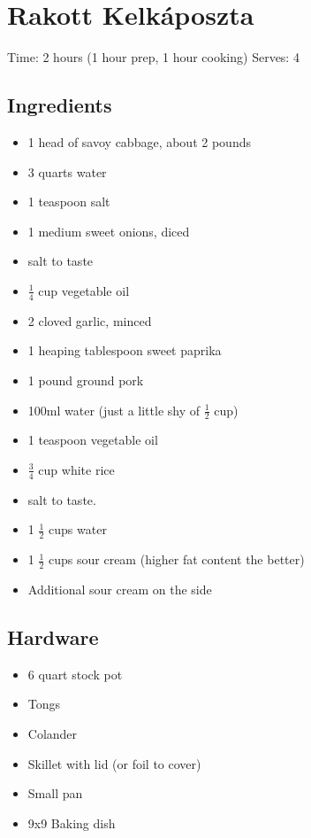 \section{Rakott Kelkáposzta}
\label{rakottKelkaposzta}
\setcounter{secnumdepth}{0}
Time: 2 hours (1 hour prep, 1 hour cooking)
Serves: 4

\begin{multicols}{2}
\subsection*{Ingredients}
\begin{itemize}
    \item 1 head of savoy cabbage, about 2 pounds
    \item 3 quarts water
    \item 1 teaspoon salt
    \item 1 medium sweet onions, diced
    \item salt to taste
    \item \( \frac{1}{4} \) cup vegetable oil
    \item 2 cloved garlic, minced
    \item 1 heaping tablespoon sweet paprika
    \item 1 pound ground pork
    \item 100ml water (just a little shy of \( \frac{1}{2} \) cup)
    \item 1 teaspoon vegetable oil
    \item \( \frac{3}{4} \) cup white rice
    \item salt to taste.
    \item 1 \( \frac{1}{2} \) cups water
    \item 1 \( \frac{1}{2} \) cups sour cream (higher fat content the better)
    \item Additional sour cream on the side
\end{itemize}

\subsection*{Hardware}
\begin{itemize}
    \item 6 quart stock pot
    \item Tongs
    \item Colander
    \item Skillet with lid (or foil to cover)
    \item Small pan
    \item 9x9 Baking dish
\end{itemize}
\clearpage


\end{multicols}
